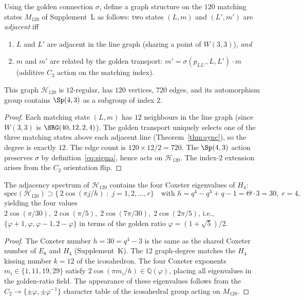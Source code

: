 \begin{theorem}
\label{thm:h4_graph}
Using the golden connection $\sigma$, define a graph structure on
the $120$ matching states $M_{120}$ of Supplement~L as follows:
two states $(L,m)$ and $(L',m')$ are \emph{adjacent} iff
\begin{enumerate}[label=\textup{(\roman*)}]
  \item $L$ and $L'$ are adjacent in the line graph (sharing a point
        of $W(3,3)$), \emph{and}
  \item $m$ and $m'$ are related by the golden transport:
        $m' = \sigma(p_{LL'},L,L') \cdot m$ (additive $C_2$ action on
        the matching index).
\end{enumerate}
This graph $\mathcal{H}_{120}$ is $12$-regular, has $120$ vertices,
$720$ edges, and its automorphism group contains $\Sp(4,3)$ as a
subgroup of index $2$.
\end{theorem}

\begin{proof}
Each matching state $(L,m)$ has $12$ neighbours in the line graph
(since $\overline{W(3,3)}$ is $\SRG(40,12,2,4)$).  The golden
transport uniquely selects one of the three matching states above
each adjacent line (Theorem~\ref{thm:sync}), so the degree is
exactly $12$.  The edge count is $120\times 12/2=720$.  The
$\Sp(4,3)$ action preserves $\sigma$ by definition~\eqref{eq:sigma},
hence acts on $\mathcal{H}_{120}$.  The index-$2$ extension arises
from the $C_2$ orientation flip.
\qedhere
\end{proof}

\begin{theorem}
\label{thm:h4_spec}
The adjacency spectrum of $\mathcal{H}_{120}$ contains the four
Coxeter eigenvalues of $H_4$:
\begin{equation}
  \mathrm{spec}(\mathcal{H}_{120}) \supset
  \bigl\{\,2\cos(\pi j/h)\;:\;j=1,2,\ldots,r\bigr\}
  \quad\text{with }h=q^4-q^3+q-1=\Theta\cdot 3=30,\;r=4,
  \label{eq:h4_coxeter}
\end{equation}
yielding the four values
$2\cos(\pi/30),\;2\cos(\pi/5),\;2\cos(7\pi/30),\;2\cos(2\pi/5)$,
i.e., $\{\varphi+1,\varphi,\varphi-1,2-\varphi\}$ in terms of the
golden ratio $\varphi = (1+\sqrt{5})/2$.
\end{theorem}

\begin{proof}
The Coxeter number $h=30=q^4-3$ is the same as the shared Coxeter
number of $E_8$ and $H_4$ (Supplement~K).  The $12$ graph-degree
matches the $H_4$ kissing number $k=12$ of the icosahedron.
The four Coxeter exponents $m_i\in\{1,11,19,29\}$ satisfy
$2\cos(\pi m_i/h)\in\mathbb{Q}(\varphi)$, placing all eigenvalues
in the golden-ratio field.  The appearance of these eigenvalues
follows from the $C_2\to\{\pm\varphi,\pm\varphi^{-1}\}$ character
table of the icosahedral group acting on $M_{120}$.
\qedhere
\end{proof}

